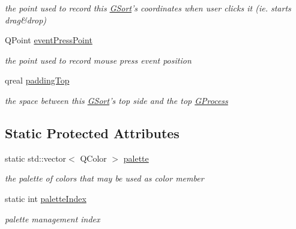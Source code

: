 \begin{DoxyCompactItemize}
\begin{DoxyCompactList}\small\item\em the point used to record this \hyperlink{class_g_sort}{\-G\-Sort}'s coordinates when user clicks it (ie. starts drag\&drop) \end{DoxyCompactList}\item 
\hypertarget{class_g_sort_ad33260958b9f1fdea916b737dedc5ba7}{\-Q\-Point \hyperlink{class_g_sort_ad33260958b9f1fdea916b737dedc5ba7}{event\-Press\-Point}}\label{class_g_sort_ad33260958b9f1fdea916b737dedc5ba7}

\begin{DoxyCompactList}\small\item\em the point used to record mouse press event position \end{DoxyCompactList}\item 
\hypertarget{class_g_sort_a92702d91a49f5a4aadf387e6b10c664a}{qreal \hyperlink{class_g_sort_a92702d91a49f5a4aadf387e6b10c664a}{padding\-Top}}\label{class_g_sort_a92702d91a49f5a4aadf387e6b10c664a}

\begin{DoxyCompactList}\small\item\em the space between this \hyperlink{class_g_sort}{\-G\-Sort}'s top side and the top \hyperlink{class_g_process}{\-G\-Process} \end{DoxyCompactList}\end{DoxyCompactItemize}
\subsection*{\-Static \-Protected \-Attributes}
\begin{DoxyCompactItemize}
\item 
\hypertarget{class_g_sort_a575406f7f0f4ce8da65e3456b7fff818}{static std\-::vector$<$ \-Q\-Color $>$ \hyperlink{class_g_sort_a575406f7f0f4ce8da65e3456b7fff818}{palette}}\label{class_g_sort_a575406f7f0f4ce8da65e3456b7fff818}

\begin{DoxyCompactList}\small\item\em the palette of colors that may be used as color member \end{DoxyCompactList}\item 
\hypertarget{class_g_sort_a684c424c03a77a4f60b88f98021bb2eb}{static int \hyperlink{class_g_sort_a684c424c03a77a4f60b88f98021bb2eb}{palette\-Index}}\label{class_g_sort_a684c424c03a77a4f60b88f98021bb2eb}

\begin{DoxyCompactList}\small\item\em palette management index \end{DoxyCompactList}\end{DoxyCompactItemize}


